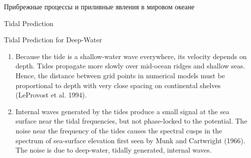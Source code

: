 \begin{chapter}{Прибрежные процессы и приливные явления в мировом океане}
\begin{section}{Tidal Prediction}
\begin{paragraph}{Tidal Prediction for Deep-Water}
\begin{enumerate}
\item 
Because the tide is a shallow-water wave everywhere, its velocity
depends on depth.  Tides propagate more slowly over mid-ocean ridges
and shallow seas. Hence, the distance between grid points in numerical
models must be proportional to depth with very close spacing on
continental shelves (LeProvost et al. 1994).
%

\item 
Internal waves generated by the tides produce a small signal at the
sea surface near the tidal frequencies, but not phase-locked to the
potential. The noise near the frequency of the tides causes the
spectral cusps in the spectrum of sea-surface elevation first seen by
Munk and Cartwright (1966). The noise is due to deep-water, tidally
generated, internal waves.
%
\end{enumerate}


\end{paragraph}
\end{section}
\end{chapter}
